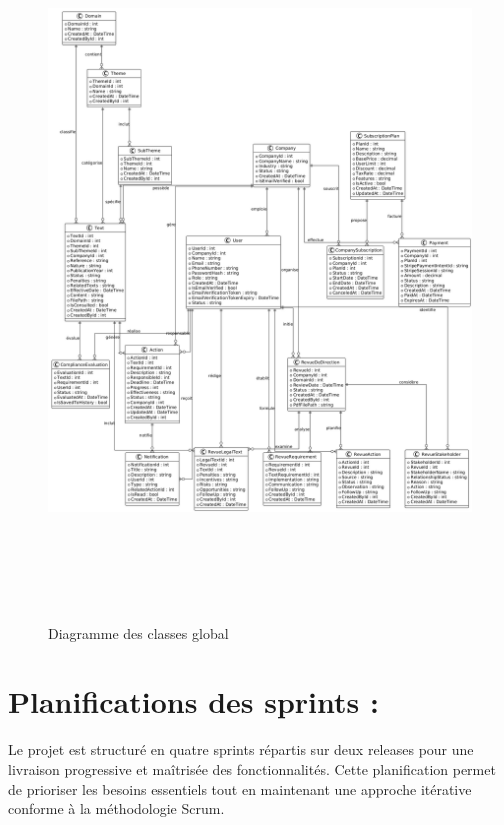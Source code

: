 \begin{figure}[H]
    \centering
    \includegraphics[width=18cm,height=19cm]{images/diagramclass.png}
    \caption{Diagramme des classes global}
\end{figure}

\section{Planifications des sprints :}

\noindent Le projet est structuré en quatre sprints répartis sur deux releases pour une livraison progressive et maîtrisée des fonctionnalités. Cette planification permet de prioriser les besoins essentiels tout en maintenant une approche itérative conforme à la méthodologie Scrum.

